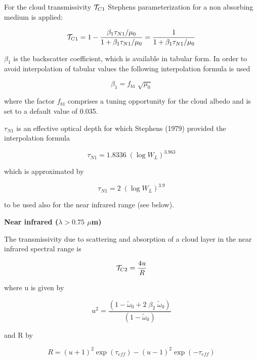 For the cloud transmissivity ${\cal T}_{C1}$ Stephens
parameterization for a non absorbing medium is
applied:

\begin{equation}
{\cal T}_{C1}=1-
\frac{\beta_1\tau_{N1}/\mu_0}{1+\beta_1\tau_{N1}
/\mu_0} = \frac{1}{ 1+\beta_1 \tau_{N1}/\mu_0}
\end{equation}

$\beta_1$ is the backscatter coefficient, which is
available in tabular form. In order to avoid interpolation
of tabular values the following interpolation formula is
used

\begin{equation}
\beta_1 =  f_{b1} \; \sqrt{\mu_0}
\end{equation}

where the factor $f_{b1}$ comprises a tuning
opportunity for the cloud albedo and is set to a default
value of 0.035.

$\tau_{N1}$ is an effective optical depth for which
Stephens (1979) provided the interpolation formula

\begin{equation}
\tau_{N1}= 1.8336 \; (\log{W_L})^{3.963}
\end{equation}

which is approximated by 

\begin{equation}
\tau_{N1}= 2\; (\log{W_L})^{3.9}
\end{equation}

to be used also for the near infrared range (see below). 

{\bf  Near infrared ($\lambda > 0.75$ $\mu$m)}

The transmissivity due to scattering and absorption of
a cloud layer in the near infrared spectral range is

\begin{equation}
{\cal T}_{C2}=\frac{4u}{R}
\end{equation}

where u is given by

\begin{equation}
u^2=\frac{(1-
\tilde{\omega}_0+2\; \beta_2 \; \tilde{\omega}_0)}{(1-
\tilde{\omega}_0)}
\end{equation}


and R by

\begin{equation}
R=(u+1)^2 \exp{(\tau_{eff})}
-(u-1)^2 \exp{(-\tau_{eff})}
\end{equation}

